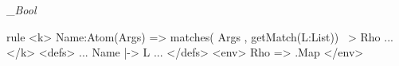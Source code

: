 \begin{greyBox}

  {\neg_{\scriptstyle\it Bool}{{}}}{}{}{}
%

rule <k> Name:Atom(Args) => matches({ Args }, getMatch(L:List)) ~> Rho ... </k>
         <defs> ... Name |-> L ... </defs>
         <env> Rho => .Map </env>
         
\end{greyBox}